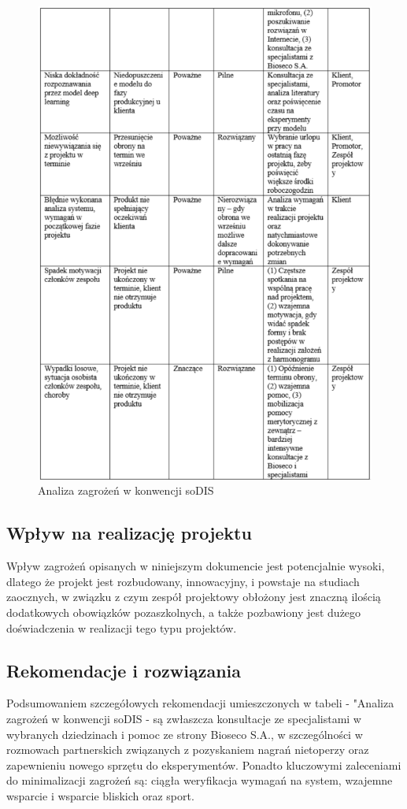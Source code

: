 \documentclass{sprz}
\begin{document}
\begin{figure}[h]
  \centering
  \includegraphics[width=1.0\textwidth]{sprz/sodis2.png}
  \caption{Analiza zagrożeń w konwencji soDIS}
  \label{img:sodis2}
\end{figure}

\subsection{Wpływ na realizację projektu}
Wpływ zagrożeń opisanych w niniejszym dokumencie jest potencjalnie wysoki, dlatego że projekt jest rozbudowany, innowacyjny, i powstaje na studiach zaocznych, w związku z czym zespół projektowy obłożony jest znaczną ilością dodatkowych obowiązków pozaszkolnych, a także pozbawiony jest dużego doświadczenia w realizacji tego typu projektów.

\subsection{Rekomendacje i rozwiązania}
Podsumowaniem szczegółowych rekomendacji umieszczonych w tabeli - "Analiza zagrożeń w konwencji soDIS - są zwłaszcza konsultacje ze specjalistami w wybranych dziedzinach i pomoc ze strony Bioseco S.A.,  w szczególności w rozmowach partnerskich związanych z pozyskaniem nagrań nietoperzy oraz zapewnieniu nowego sprzętu do eksperymentów. Ponadto kluczowymi zaleceniami do minimalizacji zagrożeń są: ciągła weryfikacja wymagań na system, wzajemne wsparcie i wsparcie bliskich oraz sport.
\end{document}
